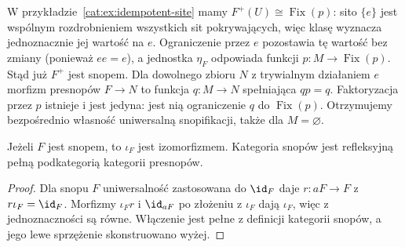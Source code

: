 \begin{center}
\end{center}

\begin{przyklad}\label{cat:ex:idempotent-sheafification}
W przykładzie~\ref{cat:ex:idempotent-site} mamy $F^+(U)\cong\operatorname{Fix}(p)$: sito $\{e\}$ jest wspólnym rozdrobnieniem wszystkich sit pokrywających, więc klasę wyznacza jednoznacznie jej wartość na $e$. Ograniczenie przez $e$ pozostawia tę wartość bez zmiany (ponieważ $ee=e$), a jednostka $\eta_F$ odpowiada funkcji $p:M\to\operatorname{Fix}(p)$. Stąd już $F^+$ jest snopem. Dla dowolnego zbioru $N$ z trywialnym działaniem $e$ morfizm presnopów $F\to N$ to funkcja $q:M\to N$ spełniająca $qp=q$. Faktoryzacja przez $p$ istnieje i jest jedyna: jest nią ograniczenie $q$ do $\operatorname{Fix}(p)$. Otrzymujemy bezpośrednio własność uniwersalną snopifikacji, także dla $M=\varnothing$.
\end{przyklad}

\begin{wniosek}\label{cat:cor:sheafification-reflective}
Jeżeli $F$ jest snopem, to $\iota_F$ jest izomorfizmem. Kategoria snopów jest refleksyjną pełną podkategorią kategorii presnopów.
\end{wniosek}
\begin{proof}
Dla snopu $F$ uniwersalność zastosowana do $\id_F$ daje $r:aF\to F$ z $r\iota_F=\id_F$. Morfizmy $\iota_Fr$ i $\id_{aF}$ po złożeniu z $\iota_F$ dają $\iota_F$, więc z jednoznaczności są równe. Włączenie jest pełne z definicji kategorii snopów, a jego lewe sprzężenie skonstruowano wyżej.
\end{proof}

